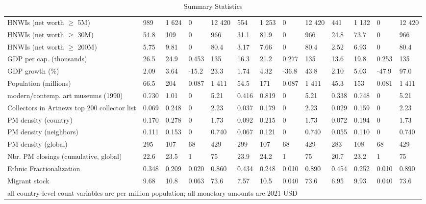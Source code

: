 \documentclass[11pt, authoryear]{elsarticle}
\begin{document}
\begin{landscape}
\begin{table}[ht]
\begin{tabular}{p{7cm}llllllllllll}
  HNWIs (net worth $\geq$ 5M) & 989 & 1 624 & 0 & 12 420 & 554 & 1 253 & 0 & 12 420 & 441 & 1 132 & 0 & 12 420 \\ 
  HNWIs (net worth $\geq$ 30M) & 54.8 & 109 & 0 & 966 & 31.1 & 81.9 & 0 & 966 & 24.8 & 73.7 & 0 & 966 \\ 
  HNWIs (net worth $\geq$ 200M) & 5.75 & 9.81 & 0 & 80.4 & 3.17 & 7.66 & 0 & 80.4 & 2.52 & 6.93 & 0 & 80.4 \\ 
  GDP per cap. (thousands) & 26.5 & 24.9 & 0.453 & 135 & 16.3 & 21.2 & 0.277 & 135 & 13.6 & 19.8 & 0.253 & 135 \\ 
  GDP growth (\%) & 2.09 & 3.64 & -15.2 & 23.3 & 1.74 & 4.32 & -36.8 & 43.8 & 2.10 & 5.03 & -47.9 & 97.0 \\ 
  Population (millions) & 66.5 & 204 & 0.087 & 1 411 & 54.5 & 171 & 0.087 & 1 411 & 45.3 & 153 & 0.081 & 1 411 \\ 
  modern/contemp. art museums (1990) & 0.730 & 1.01 & 0 & 5.21 & 0.416 & 0.819 & 0 & 5.21 & 0.338 & 0.748 & 0 & 5.21 \\ 
  Collectors in Artnews top 200 collector list & 0.069 & 0.248 & 0 & 2.23 & 0.037 & 0.179 & 0 & 2.23 & 0.029 & 0.159 & 0 & 2.23 \\ 
  PM density (country) & 0.170 & 0.278 & 0 & 1.73 & 0.092 & 0.215 & 0 & 1.73 & 0.072 & 0.194 & 0 & 1.73 \\ 
  PM density (neighbors) & 0.111 & 0.153 & 0 & 0.740 & 0.067 & 0.121 & 0 & 0.740 & 0.055 & 0.110 & 0 & 0.740 \\ 
  PM density (global) & 295 & 107 & 68 & 429 & 299 & 107 & 68 & 429 & 283 & 108 & 68 & 429 \\ 
  Nbr. PM closings (cumulative, global) & 22.6 & 23.5 & 1 & 75 & 23.9 & 24.2 & 1 & 75 & 20.7 & 23.2 & 1 & 75 \\ 
  Ethnic Fractionalization & 0.348 & 0.209 & 0.020 & 0.860 & 0.434 & 0.248 & 0.010 & 0.890 & 0.454 & 0.252 & 0.010 & 0.890 \\ 
  Migrant stock & 9.68 & 10.8 & 0.063 & 73.6 & 7.57 & 10.5 & 0.040 & 73.6 & 6.95 & 9.93 & 0.040 & 73.6 \\ 
   \hline \multicolumn{13}{l}{\footnotesize{all country-level count variables are per million population; all monetary amounts are 2021 USD}}
\end{tabular}
\caption{Summary Statistics} 
\label{tbl:descs}
\end{table}
\end{landscape}

\FloatBarrier
\end{document}
